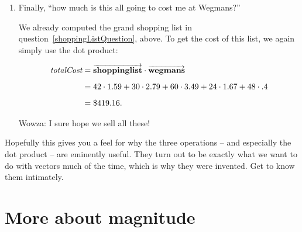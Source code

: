 \begin{enumerate}

Here's where the dot product comes in handy. We have a vector
($\overrightarrow{\textbf{brownies}}$) that gives us the amount of each
ingredient, and another ($\overrightarrow{\textbf{satfat}}$) that gives us
per-unit fat content. The dot product is just what we need: multiply each
ingredient amount by its fat content, and add up the results. It's a snap! All
we then need to do is find the per-serving total by taking only a sixteenth of
a batch, which is scalar-vector multiplication again. Putting it all together:

\begin{align*}
\textit{fatPerBrownie} &=
\frac{1}{16} (\overrightarrow{\textbf{brownies}} \cdot
\overrightarrow{\textbf{satfat}}) \\[10pt]
&= \frac{1}{16} (1\cdot 56 + 1\cdot 0 + 4\cdot 24 + 2\cdot 1 + 2\cdot 1.6)
\smallskip \\[10pt]
&= 9.825\  \textrm{grams}.
\end{align*}

Ouch. Better sneak just one of those.

\item Finally, ``how much is this all going to cost me at Wegmans?''

We already computed the grand shopping list in
question~\ref{shoppingListQuestion}, above. To get the cost of this list, we
again simply use the dot product:

\begin{align*}
\textit{totalCost} &=
\overrightarrow{\textbf{shoppinglist}} \cdot
\overrightarrow{\textbf{wegmans}} \\[5pt]
&= 42\cdot 1.59 + 30\cdot 2.79 + 60\cdot 3.49 + 24\cdot 1.67 + 48\cdot .4
\smallskip \\[5pt]
&= \$419.16.
\end{align*}

Wowza: I sure hope we sell all these!

\end{enumerate}

Hopefully this gives you a feel for why the three operations -- and especially
the dot product -- are eminently useful. They turn out to be exactly what we
want to do with vectors much of the time, which is why they were invented. Get
to know them intimately.

\section{More about magnitude}
\label{sec:norms}

